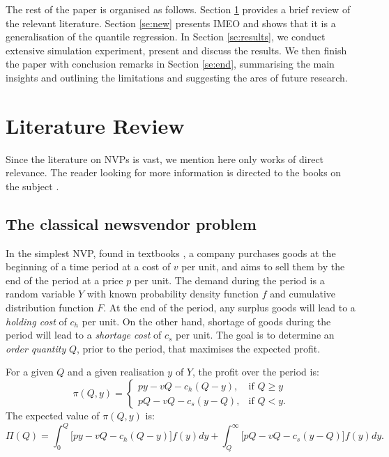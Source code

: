 \documentclass{article}
\begin{document}

The rest of the paper is organised as follows. Section \ref{se:lit} provides a brief review of the relevant literature. Section \ref{se:new} presents IMEO and shows that it is a generalisation of the quantile regression. In Section \ref{se:results}, we conduct extensive simulation experiment, present and discuss the results. We then finish the paper with conclusion remarks in Section \ref{se:end}, summarising the main insights and outlining the limitations and suggesting the ares of future research.

\section{Literature Review} \label{se:lit}

Since the literature on NVPs is vast, we mention here only works of direct relevance. The reader looking for more information is directed to the books on the subject \cite{Ch12,Po02,SPP98,Zi00}.

\subsection{The classical newsvendor problem} %

In the simplest NVP, found in textbooks \cite{Ch12}, a company purchases goods at the beginning of a time period at a cost of $v$ per unit, and aims to sell them by the end of the period at a price $p$ per unit. The demand during the period is a random variable $Y$ with known probability density function $f$ and cumulative distribution function $F$. At the end of the period, any surplus goods will lead to a \emph{holding cost} of $c_h$ per unit. On the other hand, shortage of goods during the period will lead to a \emph{shortage cost} of $c_s$ per unit. The goal is to determine an \emph{order quantity} $Q$, prior to the period, that maximises the expected profit.

For a given $Q$ and a given realisation $y$ of $Y$, the profit over the period is:
\[
    \pi(Q,y)=
    \begin{cases}
        py-vQ-c_h(Q-y),& \text{if } Q\geq y\\
        pQ-vQ-c_s(y-Q),& \text{if } Q< y.
    \end{cases}
\]
The expected value of $\pi(Q,y)$ is:
\[
    \Pi(Q) = \int_{0}^{Q} \big[ py-vQ-c_h(Q-y) \big] f(y)dy + \int_{Q}^{\infty} \big[ pQ-vQ-c_s(y-Q) \big] f(y)dy.
\]
\end{document}
